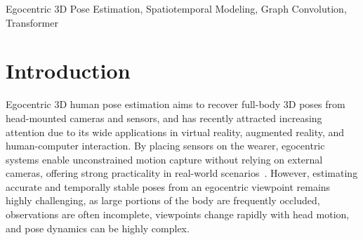 \documentclass[conference]{IEEEtran}
\begin{document}
\begin{abstract}
Egocentric 3D human pose estimation aims to recover accurate and temporally stable body poses from head-mounted sensors, yet remains challenging due to severe self-occlusion, limited field of view, and rapid motion changes. While recent transformer-based methods model long-range temporal dependencies, they often rely on implicit learning and fail to explicitly enforce anatomical structure and joint-wise temporal consistency inherent in human motion. In this paper, we propose an enhanced spatiotemporal framework that explicitly strengthens both spatial and temporal representations for egocentric 3D pose estimation. Spatially, we incorporate a learnable graph-based module to adaptively model inter-joint relationships guided by skeletal priors. Temporally, we introduce a lightweight joint-wise adaptive temporal smoothing module that enhances local temporal consistency while preserving joint-specific temporal pose patterns. By integrating these components prior to global temporal modeling, our framework provides more coherent spatiotemporal features for subsequent transformer-based reasoning. Extensive experiments on the SELF dataset demonstrate that the proposed method consistently outperforms competitive baselines across multiple evaluation metrics, while incurring only marginal computational overhead and maintaining real-time performance.
\end{abstract}



\begin{IEEEkeywords}
Egocentric 3D Pose Estimation, Spatiotemporal Modeling, Graph Convolution, Transformer
\end{IEEEkeywords}

\section{Introduction}
Egocentric 3D human pose estimation aims to recover full-body 3D poses from head-mounted cameras and sensors, and has recently attracted increasing attention due to its wide applications in virtual reality, augmented reality, and human-computer interaction\citep{b1,b2,b3,b4,b5,b6,b7,b8,b15}. By placing sensors on the wearer, egocentric systems enable unconstrained motion capture without relying on external cameras, offering strong practicality in real-world scenarios~\citep{b1,b2,b4,b5}. However, estimating accurate and temporally stable poses from an egocentric viewpoint remains highly challenging, as large portions of the body are frequently occluded, observations are often incomplete, viewpoints change rapidly with head motion, and pose dynamics can be highly complex\citep{b1,b4,b5,b6,b7}.
\end{document}
